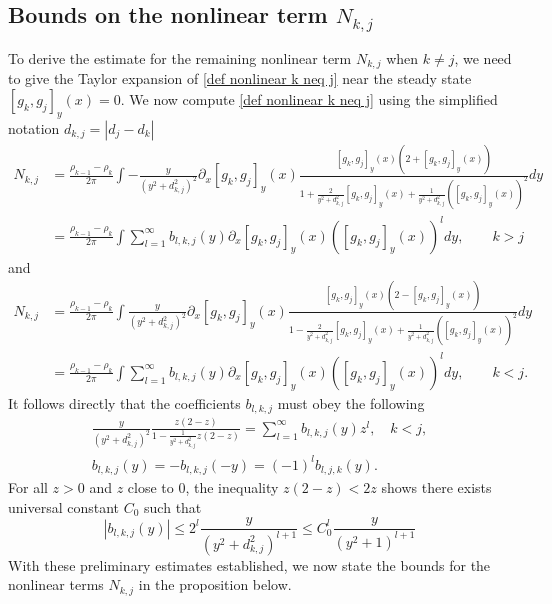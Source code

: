 \documentclass[11pt]{article}
\theoremstyle{definition}
\numberwithin{equation}{section}
\begin{document}
\subsection{Bounds on the nonlinear term $N_{k,j}$}
To derive the estimate for the remaining nonlinear term $N_{k,j}$ when $k\neq j$, we need to give the Taylor expansion of \eqref{def nonlinear k neq j} near the steady state $[g_k,g_j]_y(x)=0$. We now compute \eqref{def nonlinear k neq j} using the simplified notation $d_{k,j}=|d_j-d_k|$
\begin{align}\label{eq N k>j}
    N_{k,j}&=\frac{\rho_{k-1}-\rho_k}{2\pi}\int-\frac{y}{(y^2+d_{k,j}^2)^2}\partial_x[g_k,g_j]_y(x)\frac{[g_k,g_j]_y(x)(2+[g_k,g_j]_y(x))}{1+\frac{2}{y^2+d_{k,j}^2}[g_k,g_j]_y(x)+\frac{1}{y^2+d_{k,j}^2}([g_k,g_j]_y(x))^2}dy\\
    &=\frac{\rho_{k-1}-\rho_k}{2\pi}\int\sum\limits_{l=1}^{\infty}b_{l,k,j}(y)\partial_x[g_k,g_j]_y(x)([g_k,g_j]_y(x))^ldy,\qquad k>j
\end{align}
and
\begin{align}\label{eq N k<j}
    N_{k,j}&=\frac{\rho_{k-1}-\rho_k}{2\pi}\int\frac{y}{(y^2+d_{k,j}^2)^2}\partial_x[g_k,g_j]_y(x)\frac{[g_k,g_j]_y(x)(2-[g_k,g_j]_y(x))}{1-\frac{2}{y^2+d_{k,j}^2}[g_k,g_j]_y(x)+\frac{1}{y^2+d_{k,j}^2}([g_k,g_j]_y(x))^2}dy\\
    &=\frac{\rho_{k-1}-\rho_k}{2\pi}\int\sum\limits_{l=1}^{\infty}b_{l,k,j}(y)\partial_x[g_k,g_j]_y(x)([g_k,g_j]_y(x))^ldy,\qquad k<j.
\end{align}
It follows directly that the coefficients $b_{l,k,j}$ must obey the following
\begin{gather}\label{property of bl}
    \frac{y}{(y^2+d_{k,j}^2)^2}\frac{z(2-z)}{1-\frac{1}{y^2+d_{k,j}^2}z(2-z)}=\sum\limits_{l=1}^{\infty}b_{l,k,j}(y)z^l,\quad k<j,\\
    b_{l,k,j}(y)=-b_{l,k,j}(-y)=(-1)^lb_{l,j,k}(y).
\end{gather}
For all $z>0$ and $z$ close to 0, the inequality $z(2-z)<2z$ shows there exists universal constant $C_0$ such that
\begin{equation}\label{upper bound bl}
    |b_{l,k,j}(y)|\leq2^l\frac{y}{(y^2+d_{k,j}^2)^{l+1}}\leq C_0^l\frac{y}{(y^2+1)^{l+1}}
\end{equation}
With these preliminary estimates established, we now state the bounds for the nonlinear terms $N_{k,j}$ in the proposition below.
\end{document}
